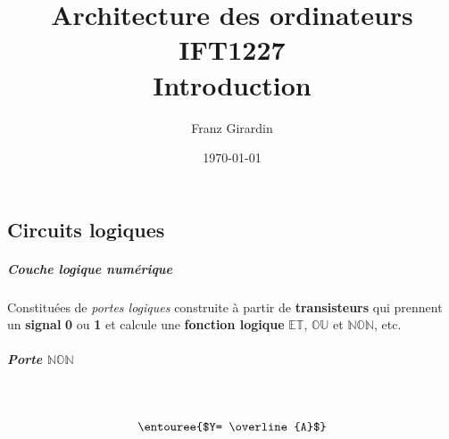 \documentclass{report}
\title{\Huge{Architecture des ordinateurs}\\{IFT1227}\\{\textbf{Introduction}}}
\author{\huge{Franz Girardin}}
\date{\today}
\begin{document}
\maketitle

\pagebreak

\pagebreak
\begin{multicols*}{3}


    \footnotesize
    \chapter{Circuits logiques}


    \paragraph{Couche logique numérique}  
    Constituées de \textit{portes logiques} construite à partir 
    de \textbf{transisteurs} qui prennent un \textbf{signal}
    \textbf{0} ou \textbf{1} et calcule 
    une \textbf{fonction logique} 
    $\mathbb{ET}$, $\mathbb{OU}$ et $\mathbb{NON}$, etc.

    \paragraph{Porte $\mathbb{NON}$}
    \mbox{}\vspace{1em}\\
    \begin{minipage}{\columnwidth}
        \begin{minipage}[b]{0.5\columnwidth}
            \centering
            \notgate
        \end{minipage}%
        \begin{minipage}[b]{0.5\columnwidth}
            \centering
        \end{minipage}
    \end{minipage}
    \[\entouree{$Y= \overline{A}$} \]



\end{multicols*}
\end{document}
